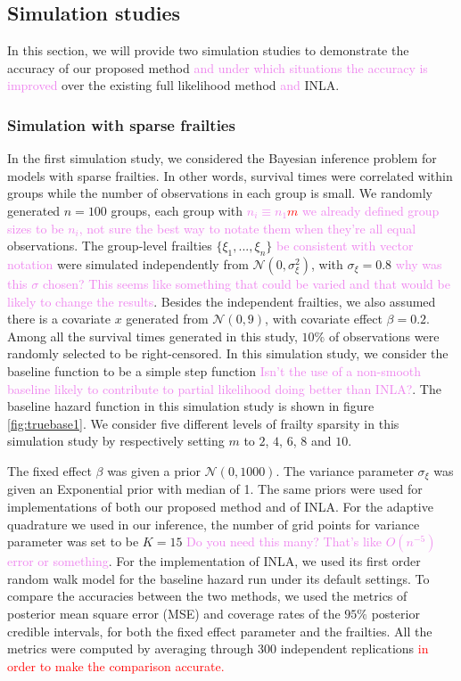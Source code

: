 \documentclass[ba]{imsart}
\newcommand{\highlight}[1]{\textcolor{red}{#1}}
\newcommand{\alex}[1]{\textcolor{violet}{{ }#1}}
\begin{document}
\subsection{Simulation studies}\label{subsec:sim}
In this section, we will provide two simulation studies to demonstrate the accuracy of our proposed method \alex{and under which situations the accuracy is improved} over the existing full likelihood method \alex{and} INLA.

\subsubsection{Simulation with sparse frailties}\label{subsubsec:sim1}

In the first simulation study, we considered the Bayesian inference problem for models with sparse frailties. In other words, survival times were correlated within groups while the number of observations in each group is small. We randomly generated $n = 100$ groups, each group with\alex{$n_{i}\equiv n_{1}$}\highlight{$m$}\alex{we already defined group sizes to be $n_{i}$, not sure the best way to notate them when they're all equal} observations. The group-level frailties $\{\xi_1,...,\xi_{n}\}$\alex{be consistent with vector notation} were simulated independently from $\mathcal{N}(0,\sigma_\xi^{2})$, with $\sigma_{\xi} = 0.8$\alex{why was this $\sigma$ chosen? This seems like something that could be varied and that would be likely to change the results}. Besides the independent frailties, we also assumed there is a covariate $x$ generated from $\mathcal{N}(0,9)$, with covariate effect $\beta = 0.2$. Among all the survival times generated in this study, $10\%$ of observations were randomly selected to be right-censored. In this simulation study, we consider the baseline function to be a simple step function\alex{Isn't the use of a non-smooth baseline likely to contribute to partial likelihood doing better than INLA?}. The baseline hazard function in this simulation study is shown in figure \ref{fig:truebase1}. We consider five different levels of frailty sparsity in this simulation study by respectively setting $m$ to $2$, $4$, $6$, $8$ and $10$.

The fixed effect $\beta$ was given a prior $\mathcal{N}(0,1000)$. The variance parameter $\sigma_\xi$ was given an Exponential prior with median of 1. The same priors were used for implementations of both our proposed method and of INLA. For the adaptive quadrature we used in our inference, the number of grid points for variance parameter was set to be $K = 15$\alex{Do you need this many? That's like $O(n^{-5})$ error or something}. For the implementation of INLA, we used its first order random walk model for the baseline hazard run under its default settings. To compare the accuracies between the two methods, we used the metrics of posterior mean square error (MSE) and coverage rates of the $95\%$ posterior credible intervals, for both the fixed effect parameter and the frailties. All the metrics were computed by averaging through 300 independent replications \highlight{in order to make the comparison accurate.} 
\end{document}
